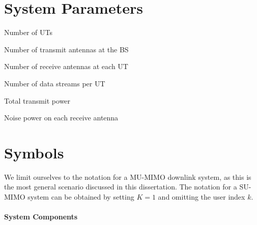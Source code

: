 \section*{System Parameters}

\begin{description}[leftmargin=2.5cm, labelwidth=2cm, labelsep=0.25em, font=\normalfont]
    \item[$ K $]   Number of UTs
    \item[$ N_T $] Number of transmit antennas at the BS
    \item[$ N_R $] Number of receive antennas at each UT
    \item[$ N_S $] Number of data streams per UT
    \item[$ P_T $] Total transmit power
    \item[$ N_0 $] Noise power on each receive antenna
\end{description}

\section*{Symbols}

We limit ourselves to the notation for a \acs{MU}-\acs{MIMO} downlink system, as this is the most general scenario discussed in this dissertation. The notation for a \acs{SU}-\acs{MIMO} system can be obtained by setting $K=1$ and omitting the user index $k$.

\paragraph*{System Components}

